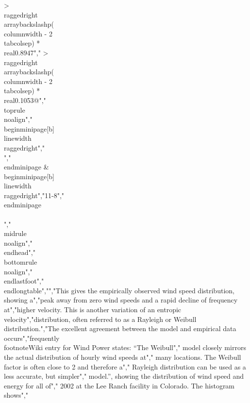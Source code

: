 {{{{{{{>{\\raggedright\\arraybackslash}p{(\\columnwidth - 2\\tabcolsep) * \\real{0.8947}}","  >{\\raggedright\\arraybackslash}p{(\\columnwidth - 2\\tabcolsep) * \\real{0.1053}}@{}}","\\toprule\\noalign{}","\\begin{minipage}[b]{\\linewidth}\\raggedright","\\[\\begin{matrix}","p(\\nu)\\ d\\nu = p(E)\\ dE \\\\","p(\\nu) = p(E) \\bullet \\frac{dE}{d\\nu} = 2c\\nu \\bullet e^{- c\\nu^{2}}","\\end{matrix}\\]","\\end{minipage} & \\begin{minipage}[b]{\\linewidth}\\raggedright","11-8","\\end{minipage} \\\\","\\midrule\\noalign{}","\\endhead","\\bottomrule\\noalign{}","\\endlastfoot","\\end{longtable}","","This gives the empirically observed wind speed distribution, showing a","peak away from zero wind speeds and a rapid decline of frequency at","higher velocity. This is another variation of an entropic velocity","distribution, often referred to as a Rayleigh or Weibull distribution.","The excellent agreement between the model and empirical data occurs","frequently\\footnote{Wiki entry for Wind Power states: ``The Weibull","  model closely mirrors the actual distribution of hourly wind speeds at","  many locations. The Weibull factor is often close to 2 and therefore a","  Rayleigh distribution can be used as a less accurate, but simpler","  model.'', showing the distribution of wind speed and energy for all of","  2002 at the Lee Ranch facility in Colorado. The histogram shows","  }}}}}}}
